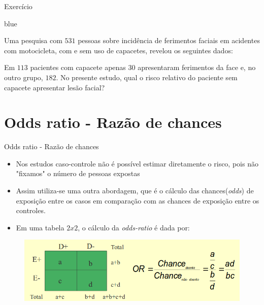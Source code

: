 \documentclass[9pt]{beamer}
\begin{document}
\begin{frame}{Exercício}{}

\begin{block}{blue}{}

Uma pesquisa com $531$ pessoas sobre incidência de ferimentos faciais em
acidentes com motocicleta, com e sem uso de capacetes, revelou os
seguintes dados:\\
\indent

Em $113$ pacientes com capacete apenas $30$ apresentaram ferimentos da
face e, no outro grupo, $182$. No presente estudo, qual o risco relativo
do paciente sem capacete apresentar lesão facial?
\end{block}



\end{frame}






\section{Odds ratio - Razão de chances}
\begin{frame}{Odds ratio - Razão de chances}{}

\begin{itemize}
  \item Nos estudos caso-controle não é possível estimar diretamente o
    risco, pois não "fixamos" o número de pessoas expostas
  \item Assim utiliza-se uma outra abordagem, que é o cálculo das
    chances(\textit{odds}) de exposição entre os casos em comparação com
    as chances de exposição entre os controles.
  \item Em uma tabela $2x2$, o cálculo da \textit{odds-ratio} é dada por:

\end{itemize}
\begin{figure}[!htb]
    \centering
    \includegraphics[scale=0.4]{tab3.png}
  \end{figure}
\end{frame}
\end{document}
